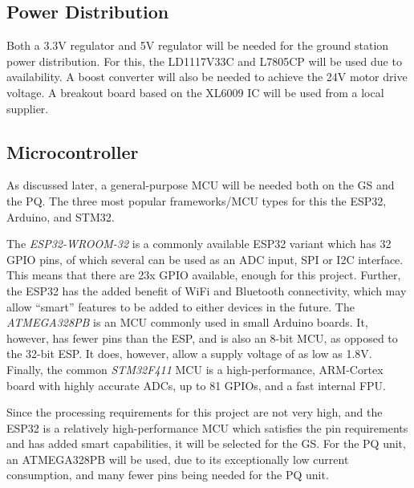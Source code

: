 \subsection{Power Distribution}
Both a 3.3V regulator and 5V regulator will be needed for the ground station power distribution. For this, the LD1117V33C and L7805CP will be used due to availability. A boost converter will also be needed to achieve the 24V motor drive voltage. A breakout board based on the XL6009 IC will be used from a local supplier.

\subsection{Microcontroller}
As discussed later, a general-purpose MCU will be needed both on the GS and the PQ. The three most popular frameworks/MCU types for this the ESP32, Arduino, and STM32.

The \textit{ESP32-WROOM-32} is a commonly available ESP32 variant which has 32 GPIO pins, of which several can be used as an ADC input, SPI or I2C interface. This means that there are 23x GPIO available, enough for this project. Further, the ESP32 has the added benefit of WiFi and Bluetooth connectivity, which may allow “smart” features to be added to either devices in the future. The \textit{ATMEGA328PB} is an MCU commonly used in small Arduino boards. It, however, has fewer pins than the ESP, and is also an 8-bit MCU, as opposed to the 32-bit ESP. It does, however, allow a supply  voltage of as low as 1.8V. Finally, the common \textit{STM32F411} MCU is a high-performance, ARM-Cortex board with highly accurate ADCs, up to 81 GPIOs, and a fast internal FPU.

Since the processing requirements for this project are not very high, and the ESP32 is a relatively high-performance MCU which satisfies the pin requirements and has added smart capabilities, it will be selected for the GS. For the PQ unit, an ATMEGA328PB will be used, due to its exceptionally low current consumption, and many fewer pins being needed for the PQ unit.
